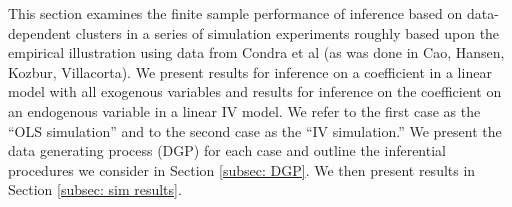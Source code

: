 \documentclass[preprint]{imsart}
\numberwithin{equation}{section}
\theoremstyle{plain}
\theoremstyle{definition}
\renewcommand{\(}{\left(}
\renewcommand{\)}{\right)}
\renewcommand{\[}{\left[}
\renewcommand{\]}{\right]}
\newcommand{\G}{k}
\renewcommand{\leq}{\leqslant}
\begin{document}
%



This section examines the finite sample performance of inference based on data-dependent clusters in a series of simulation experiments roughly based upon the empirical illustration using data from Condra et al (as was done in Cao, Hansen, Kozbur, Villacorta). We present results for inference on a coefficient in a linear model with all exogenous variables and results for inference on the coefficient on an endogenous variable in a linear IV model. We refer to the first case as the ``OLS simulation'' and to the second case as the ``IV simulation.'' We present the data generating process (DGP) for each case and outline the inferential procedures we consider in Section \ref{subsec: DGP}. We then present results in Section \ref{subsec: sim results}. 

\end{document}
